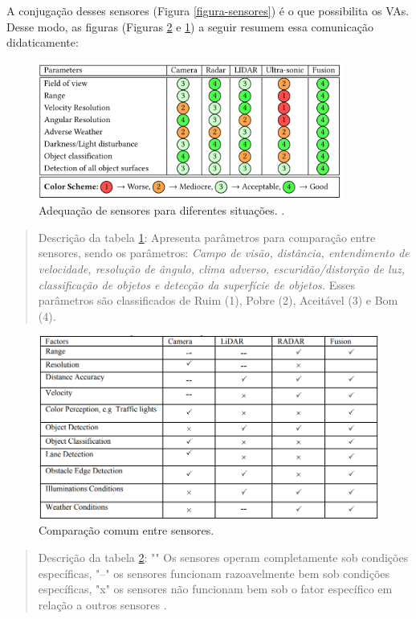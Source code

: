 A conjugação desses sensores (Figura \ref{figura-sensores}) é o que possibilita os VAs. Desse modo, as figuras (Figuras \ref{tabela-juncao} e \ref{all-sense}) a seguir resumem essa comunicação didaticamente:

\begin{figure}[H]
\centering
\includegraphics[width=10cm]{Figures/all-sense.png}
\caption{Adequação de sensores para diferentes situações. \cite{sensors-yet}.}
\label{all-sense}
\end{figure}
\begin{quote}
Descrição da tabela \ref{all-sense}: Apresenta parâmetros para comparação entre sensores, sendo os parâmetros: \textit{Campo de visão, distância, entendimento de velocidade, resolução de ângulo, clima adverso, escuridão/distorção de luz, classificação de objetos e detecção da superfície de objetos.} Esses parâmetros são classificados de Ruim (1), Pobre (2), Aceitável (3) e Bom (4).
\end{quote}

\begin{figure}[H]
\centering
\includegraphics[width=12cm]{Figures/juncao-table.png}
\caption{Comparação comum entre sensores.}
\label{tabela-juncao}
\end{figure}
\begin{quote}
Descrição da tabela \ref{tabela-juncao}: "\checkmark" Os sensores operam completamente sob condições específicas,
"--" os sensores funcionam razoavelmente bem sob condições específicas, "x" os sensores não funcionam bem sob o fator específico em relação a outros sensores \cite{sensors}.
\end{quote}

